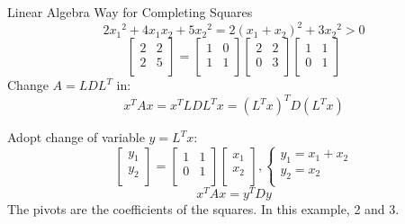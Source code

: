 \documentclass{beamer}
\begin{document}
\begin{frame}{Linear Algebra Way for Completing Squares}
    \begin{equation*}
        2{x_1}^2+4x_1x_2+5{x_2}^2=2\left( x_1+x_2 \right) ^2+3{x_2}^2>0
    \end{equation*}
    \begin{equation*}
        \left[ \begin{matrix}
            2&		2\\
            2&		5\\
        \end{matrix} \right] =\left[ \begin{matrix}
            1&		0\\
            1&		1\\
        \end{matrix} \right] \left[ \begin{matrix}
            2&		2\\
            0&		3\\
        \end{matrix} \right] \left[ \begin{matrix}
            1&		1\\
            0&		1\\
        \end{matrix} \right]
    \end{equation*}
Change $A=LDL^T$ in:
\begin{equation*}
    x^TAx=x^TLDL^Tx=\left( L^Tx \right) ^TD\left( L^Tx \right)
\end{equation*}

\vspace{3pt}
Adopt change of variable $y=L^Tx$:
\begin{equation*}
    \left[ \begin{array}{c}
        y_1\\
        y_2\\
    \end{array} \right] =\left[ \begin{matrix}
        1&		1\\
        0&		1\\
    \end{matrix} \right] \left[ \begin{array}{c}
        x_1\\
        x_2\\
    \end{array} \right] , \begin{cases}
        y_1=x_1+x_2\\
        y_2=x_2\\
    \end{cases}
\end{equation*}
\begin{equation*}
    x^TAx=y ^TDy
\end{equation*}
The pivots are the coefficients of the squares. In this example, 2 and 3.
\end{frame}
\end{document}
